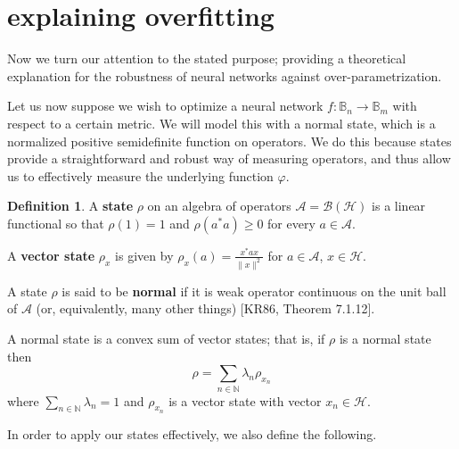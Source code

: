 \documentclass[12pt]{amsart}
\theoremstyle{definition}
\newtheorem{definition}[theorem]{Definition}
\numberwithin{equation}{section}
\begin{document}
\section{explaining overfitting}

Now we turn our attention to the stated purpose; providing a theoretical explanation for the robustness of neural networks against over-parametrization. 

Let us now suppose we wish to optimize a neural network $f: \mathbb B_n \rightarrow \mathbb B_m$ with respect to a certain metric. We will model this with a normal state, which is a normalized positive semidefinite function on operators. We do this because states provide a straightforward and robust way of measuring operators, and thus allow us to effectively measure the underlying function $\varphi$. 

\begin{definition}
    A \textbf{state} $\rho$ on an algebra of operators $\mathcal A = \mathcal B(\mathcal H)$ is a linear functional so that $\rho(1)=1$ and $\rho(a^*a) \geq 0$ for every $a \in \mathcal A$.
    
    A \textbf{vector state} $\rho_x$ is given by $\rho_x(a) = \frac{x^*ax}{\|x\|^2}$ for $a\in \mathcal A$, $x\in \mathcal H$. 

    A state $\rho$ is said to be \textbf{normal} if it is weak operator continuous on the unit ball of $\mathcal A$ (or, equivalently, many other things) [KR86, Theorem 7.1.12].

    A normal state is a convex sum of vector states; that is, if $\rho$ is a normal state then \[\rho = \sum_{n \in \mathbb N}\lambda_n\rho_{x_n}\] where $\sum_{n\in\mathbb N}\lambda_n=1$ and $\rho_{x_n}$ is a vector state with vector $x_n \in \mathcal H$. 
\end{definition}
In order to apply our states effectively, we also define the following.
\end{document}
